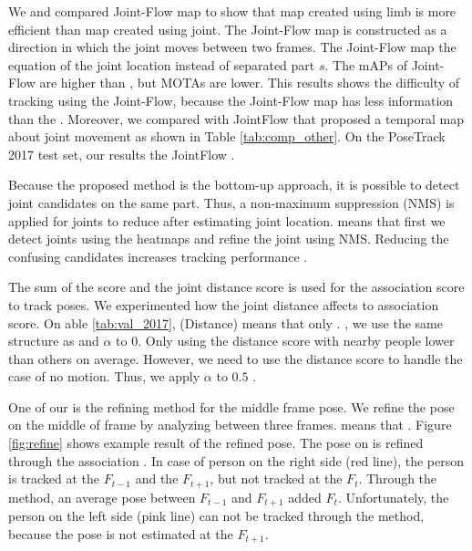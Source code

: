 \documentclass[conference]{IEEEtran}
\begin{document}
We  and compared  Joint-Flow map to show that  map created using limb is more efficient than  map created using joint. The Joint-Flow map is constructed as a direction in which the joint moves between two frames. The Joint-Flow map  the equation of  the joint location instead of separated part $s$.
The mAPs of Joint-Flow are higher than 
, but MOTAs are lower. 
This results shows the difficulty of tracking using the Joint-Flow, because the Joint-Flow map has less information than the 
. Moreover, we compared with JointFlow \cite{doering2018joint} that proposed a temporal map about joint movement as shown in Table \ref{tab:comp_other}. On the PoseTrack 2017 test set, our results  the JointFlow \cite{doering2018joint}.



Because the proposed method is the bottom-up approach, it is possible to detect  joint candidates on the same part. 
Thus, a non-maximum suppression (NMS) is applied for joints to reduce  after estimating joint location.  means that first we detect joints using the  heatmaps and refine the joint using NMS. Reducing the confusing candidates increases tracking performance .

The sum of the 
score and the joint distance score is used for the association score to track poses. We experimented  how the joint distance affects to association score. On able \ref{tab:val_2017}, (Distance) means that only . , we use the same structure as 
and  \(\alpha\) to \(0\). 
Only using the distance score  with nearby people  lower than others on average. However, we need to use the distance score to handle the case of no motion. Thus, we apply \(\alpha\) to \(0.5\) .



One of our  is the refining method for the middle frame pose. We refine the pose on the middle of frame by analyzing between three frames.  means that . 
Figure \ref{fig:refine} shows  example result of the refined pose. The pose on  is refined through the association . In case of  person on the right side (red line), the person is tracked at the $F_{t-1}$ and the $F_{t+1}$, but not tracked at the $F_t$. Through the  method, an average pose between $F_{t-1}$ and $F_{t+1}$  added  $F_t$. 
Unfortunately, the person on the left side (pink line) can not be tracked through the  method, because the pose is not estimated at the $F_{t+1}$.  
\end{document}
